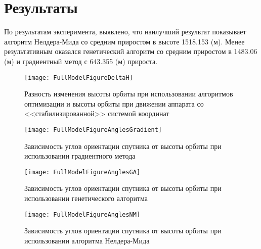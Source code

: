 \section{Результаты}
\noindent\indent По результатам эксперимента, выявлено, что наилучший результат
показывает алгоритм Нелдера-Мида со средним приростом в высоте 1518.153 (м). Менее
результативным оказался генетический алгоритм со средним приростом в 1483.06 (м) и
градиентный метод с 643.355 (м) прироста.
\begin{figure}[h]
  \centering
  \texttt{[image: FullModelFigureDeltaH]}
  \caption{Разность изменения высоты орбиты при использовании алгоритмов оптимизации
  и высоты орбиты при движении аппарата со <<стабилизированной>> системой координат }
  \label{fig:KeplerParams2Angles}
\end{figure}\par
\begin{figure}[h]
  \centering
  \texttt{[image: FullModelFigureAnglesGradient]}
  \caption{Зависимость углов ориентации спутника от высоты орбиты при использовании
  градиентного метода}
  \label{fig:KeplerParams2Angles}
\end{figure}\par
\begin{figure}[h]
  \centering
  \texttt{[image: FullModelFigureAnglesGA]}
  \caption{Зависимость углов ориентации спутника от высоты орбиты при использовании
  генетического алгоритма}
  \label{fig:KeplerParams2Angles}
\end{figure}\par
\begin{figure}[!h]
  \centering
  \texttt{[image: FullModelFigureAnglesNM]}
  \caption{Зависимость углов ориентации спутника от высоты орбиты при использовании
  алгоритма Нелдера-Мида}
  \label{fig:KeplerParams2Angles}
\end{figure}
\clearpage
